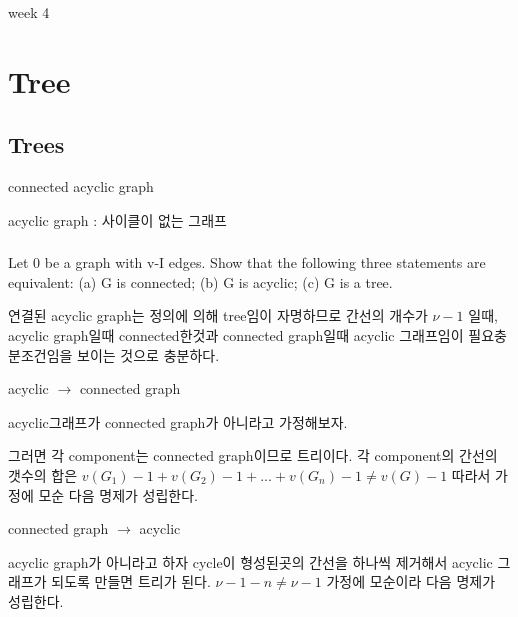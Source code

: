 
week 4
\section{Tree}
\subsection{Trees}

\begin{dfn}[tree] connected acyclic graph

    acyclic graph : 사이클이 없는 그래프
\end{dfn}

\subsubsection{} 
%
\subsubsection{} 
%
\subsubsection{} 
%
\subsubsection{} 
%
\subsubsection{} 
Let 0 be a graph with v-I edges. Show that the following three statements are equivalent: 
(a) G is connected;
(b) G is acyclic;
(c) G is a tree.

연결된 acyclic graph는 정의에 의해 tree임이 자명하므로 간선의 개수가 $\nu -1$  일때, acyclic graph일때 connected한것과 connected graph일때 acyclic 그래프임이 필요충분조건임을 보이는 것으로 충분하다.

acyclic $\rightarrow$ connected graph

acyclic그래프가 connected graph가 아니라고 가정해보자.

그러면 각 component는 connected graph이므로 트리이다.
각 component의 간선의 갯수의 합은 $v(G_1)-1 + v(G_2)-1 + ... + v(G_n)-1 \neq v(G)-1 $
따라서 가정에 모순 다음 명제가 성립한다.

connected graph $\rightarrow$ acyclic

acyclic graph가 아니라고 하자 cycle이 형성된곳의 간선을 하나씩 제거해서 acyclic 그래프가 되도록 만들면 트리가 된다.
$\nu-1-n \neq \nu -1 $ 가정에 모순이라 다음 명제가 성립한다.
